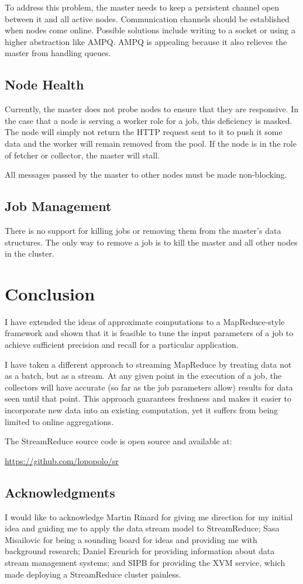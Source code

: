 \documentclass[12pt,twocolumn]{article}
\begin{document}
To address this problem, the master needs to keep a persistent channel open between
it and all active nodes. Communication channels should be established when nodes come online.
Possible solutions include writing to a socket or using a higher abstraction like AMPQ\@.
AMPQ is appealing because it also relieves the master from handling queues.

\subsection{Node Health}
Currently, the master does not probe nodes to ensure that they are responsive. In the case that
a node is serving a worker role for a job, this deficiency is masked. The node will simply not
return the HTTP request sent to it to push it some data and the worker will remain removed from
the pool. If the node is in the role of fetcher or collector, the master will stall.

All messages passed by the master to other nodes must be made non-blocking.

\subsection{Job Management}
There is no support for killing jobs or removing them from the master's data structures. The only
way to remove a job is to kill the master and all other nodes in the cluster.

\section{Conclusion}
I have extended the ideas of approximate computations to a MapReduce-style framework and shown
that it is feasible to tune the input parameters of a job to achieve sufficient precision and
recall for a particular application.

I have taken a different approach to streaming MapReduce by treating data not as a batch, but
as a stream. At any given point in the execution of a job, the collectors will have accurate
(so far as the job parameters allow) results for data seen until that point. This approach
guarantees freshness and makes it easier to incorporate new data into an existing computation,
yet it suffers from being limited to online aggregations.

The StreamReduce source code is open source and available at:
\begin{center}
  \url{https://github.com/lopopolo/sr}
\end{center}

\subsection*{Acknowledgments}
I would like to acknowledge Martin Rinard for giving me direction for my initial idea
and guiding me to apply the data stream model to StreamReduce; Sasa Misailovic for being
a sounding board for ideas and providing me with background research; Daniel Erenrich for
providing information about data stream management systems; and SIPB for providing the
XVM service, which made deploying a StreamReduce cluster painless.

{}

\end{document}
